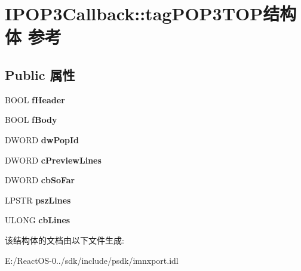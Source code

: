 \hypertarget{struct_i_p_o_p3_callback_1_1tag_p_o_p3_t_o_p}{}\section{I\+P\+O\+P3\+Callback\+:\+:tag\+P\+O\+P3\+T\+O\+P结构体 参考}
\label{struct_i_p_o_p3_callback_1_1tag_p_o_p3_t_o_p}
\subsection*{Public 属性}
\begin{DoxyCompactItemize}
\item 
\mbox{\label{struct_i_p_o_p3_callback_1_1tag_p_o_p3_t_o_p_a2dbfdeb9e6960ee664b7e34ed3a31dee}} 
B\+O\+OL {\bfseries f\+Header}
\item 
\mbox{\label{struct_i_p_o_p3_callback_1_1tag_p_o_p3_t_o_p_a30d78e3a5a0472d22dda700dab1abc0d}} 
B\+O\+OL {\bfseries f\+Body}
\item 
\mbox{\label{struct_i_p_o_p3_callback_1_1tag_p_o_p3_t_o_p_a18cb7bd1ec4d924cac5121ec874d6e92}} 
D\+W\+O\+RD {\bfseries dw\+Pop\+Id}
\item 
\mbox{\label{struct_i_p_o_p3_callback_1_1tag_p_o_p3_t_o_p_a20d2f6f853e891f22e51cf74f7a4fe36}} 
D\+W\+O\+RD {\bfseries c\+Preview\+Lines}
\item 
\mbox{\label{struct_i_p_o_p3_callback_1_1tag_p_o_p3_t_o_p_af91a3e954e58ca8dd2312d54a0714bfd}} 
D\+W\+O\+RD {\bfseries cb\+So\+Far}
\item 
\mbox{\label{struct_i_p_o_p3_callback_1_1tag_p_o_p3_t_o_p_a7cfcf5396a9bdcc6dc7ba6fb52bafa8e}} 
L\+P\+S\+TR {\bfseries psz\+Lines}
\item 
\mbox{\label{struct_i_p_o_p3_callback_1_1tag_p_o_p3_t_o_p_a4557b9eeb191fd5d4531caacd3f5e474}} 
U\+L\+O\+NG {\bfseries cb\+Lines}
\end{DoxyCompactItemize}


该结构体的文档由以下文件生成\+:\begin{DoxyCompactItemize}
\item 
E\+:/\+React\+O\+S-\/0../sdk/include/psdk/imnxport.\+idl\end{DoxyCompactItemize}

